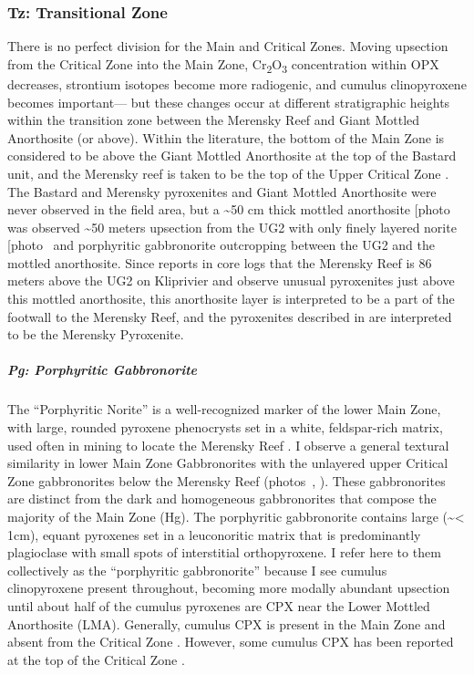 \subsubsection{Tz: Transitional Zone}
\label{sec:ch5-zone-tz}

There is no perfect division for the Main and Critical Zones. Moving
upsection from the Critical Zone into the Main Zone, Cr\textsubscript{2}O\textsubscript{3} concentration within OPX decreases, strontium isotopes become more
radiogenic, and cumulus clinopyroxene becomes important--- but these
changes occur at different stratigraphic heights within the transition
zone \citep{cawthorn2015} between the Merensky Reef and Giant Mottled
Anorthosite (or above). Within the literature, the bottom of the Main
Zone is considered to be above the Giant Mottled Anorthosite at the top
of the Bastard unit, and the Merensky reef is taken to be the top of the
Upper Critical Zone \citep{cawthorn2015,mitchell2002,vandermerwe2007}. The Bastard and Merensky pyroxenites and Giant Mottled
Anorthosite were never observed in the field area, but a
\textasciitilde50 cm thick mottled anorthosite {[}photo~\ChFivePhoto{81}{]} was
observed \textasciitilde50 meters upsection from the UG2 with only
finely layered norite {[}photo~\ChFivePhoto{80}{]} and porphyritic gabbronorite
outcropping between the UG2 and the mottled anorthosite. Since
\citet{vandermerwe2007} reports in core logs that the Merensky Reef is 86 meters
above the UG2 on Kliprivier and \citet{latypovetal2022} observe unusual
pyroxenites just above this mottled anorthosite, this anorthosite layer
is interpreted to be a part of the footwall to the Merensky Reef, and
the pyroxenites described in \citet{latypovetal2022} are interpreted to be
the Merensky Pyroxenite.

\subparagraph{Pg: Porphyritic Gabbronorite}
\label{sec:ch5-unit-pg}

The ``Porphyritic Norite'' is a well-recognized marker of the lower Main
Zone, with large, rounded pyroxene phenocrysts set in a white,
feldspar-rich matrix, used often in mining to locate the Merensky Reef
\citep{sacs1980,vongruenewaldt1985}. I observe a general textural
similarity in lower Main Zone Gabbronorites with the unlayered upper
Critical Zone gabbronorites below the Merensky Reef (photos~, ).
These gabbronorites are distinct from the dark and homogeneous
gabbronorites that compose the majority of the Main Zone (Hg). The
porphyritic gabbronorite contains large (\textasciitilde\textless{} 1cm),
equant pyroxenes set in a leuconoritic matrix that is predominantly
plagioclase with small spots of interstitial orthopyroxene. I refer here
to them collectively as the ``porphyritic gabbronorite'' because I see
cumulus clinopyroxene present throughout, becoming more modally abundant
upsection until about half of the cumulus pyroxenes are CPX near the
Lower Mottled Anorthosite (LMA). Generally, cumulus CPX is present in
the Main Zone and absent from the Critical Zone \citep{cawthorn2015}.
However, some cumulus CPX has been reported at the top of the Critical
Zone \citep{cameron1982,sacs1980}.


